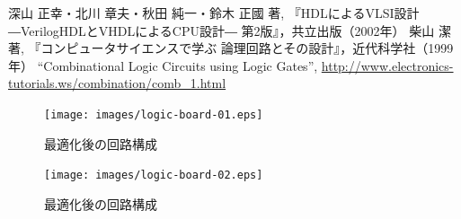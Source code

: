 \documentclass[uplatex]{jsarticle}
\begin{document}
\begin{thebibliography}{99}
 深山 正幸・北川 章夫・秋田 純一・鈴木 正國 著, 『HDLによるVLSI設計―VerilogHDLとVHDLによるCPU設計― 第2版』，共立出版（2002年）
 柴山 潔 著, 『コンピュータサイエンスで学ぶ 論理回路とその設計』，近代科学社（1999年）
 ``Combinational Logic Circuits using Logic Gates'', \url{http://www.electronics-tutorials.ws/combination/comb_1.html}
\end{thebibliography}

\clearpage

\appendix

\begin{figure}[htbp]
  \begin{center}
    \texttt{[image: images/logic-board-01.eps]}
    \caption{最適化後の回路構成}
    \label{fig:lb-01}
  \end{center}
\end{figure}

\begin{figure}[htbp]
  \begin{center}
    \texttt{[image: images/logic-board-02.eps]}
    \caption{最適化後の回路構成}
    \label{fig:lb-02}
  \end{center}
\end{figure}

\clearpage




















\end{document}
